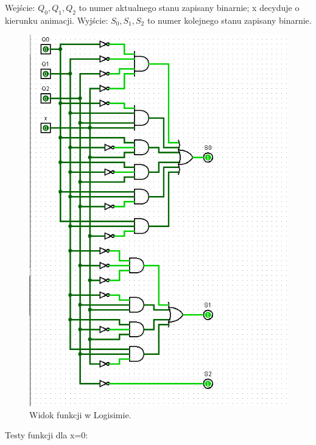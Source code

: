 \documentclass[]{article}
\begin{document}
Wejście: $Q_0, Q_1, Q_2$ to numer aktualnego stanu zapisany binarnie; x decyduje o kierunku animacji.
Wyjście: $S_0, S_1, S_2$ to numer kolejnego stanu zapisany binarnie.
\begin{figure}[H]
	\centering
	\includegraphics[width=1\textwidth]{realizacja.png}
	\caption{Widok funkcji w Logisimie.}
\end{figure}
\newpage
Testy funkcji dla x=0:
\newline
\end{document}
